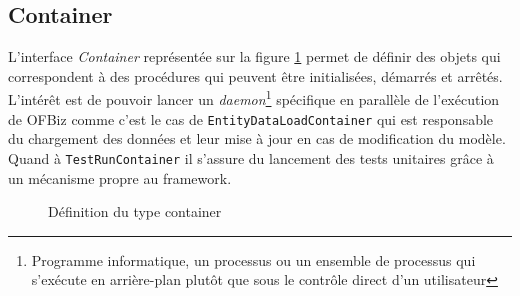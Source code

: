 \subsection{Container}
L'interface \emph{Container} représentée sur la figure \ref{container} permet de définir des objets qui correspondent à des procédures qui peuvent être initialisées, démarrés et arrêtés. L'intérêt est de pouvoir lancer un \emph{daemon}\footnote{Programme informatique, un processus ou un ensemble de processus qui s'exécute en arrière-plan plutôt que sous le contrôle direct d'un utilisateur} spécifique en parallèle de l'exécution de OFBiz comme c'est le cas de \verb|EntityDataLoadContainer| qui est responsable du chargement des données et leur mise à jour en cas de modification du modèle. Quand à \verb|TestRunContainer| il s'assure du lancement des tests unitaires grâce à un mécanisme propre au framework. 
\begin{figure}[h!]
	\centering
	
	
	\caption{Définition du type container}
	\label{container}
\end{figure}
